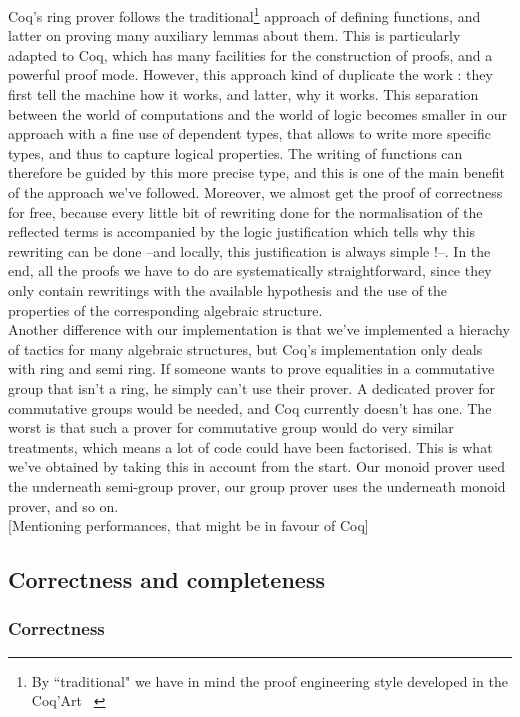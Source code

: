 Coq's ring prover follows the traditional\footnote{By ``traditional" we have in mind the proof engineering style developed in the Coq'Art ~\cite{BertotC04}}  approach of defining functions, and latter on proving many auxiliary lemmas about them. This is particularly adapted to Coq, which has many facilities for the construction of proofs, and a powerful proof mode. However, this approach kind of duplicate the work : they first tell the machine how it works, and latter, why it works. This separation between the world of computations and the world of logic becomes smaller in our approach with a fine use of dependent types, that allows to write more specific types, and thus to capture logical properties. The writing of functions can therefore be guided by this more precise type, and this is one of the main benefit of the approach we've followed. Moreover, we almost get the proof of correctness for free, because every little bit of rewriting done for the normalisation of the reflected terms is accompanied by the logic justification which tells why this rewriting can be done --and locally, this justification is always simple !--. In the end, all the proofs we have to do are systematically straightforward, since they only contain rewritings with the available hypothesis and the use of the properties of the corresponding algebraic structure. \\

Another difference with our implementation is that we've implemented a hierachy of tactics for many algebraic structures, but Coq's implementation only deals with ring and semi ring. If someone wants to prove equalities in a commutative group that isn't a ring, he simply can't use their prover. A dedicated prover for commutative groups would be needed, and Coq currently doesn't has one. The worst is that such a prover for commutative group would do very similar treatments, which means a lot of code could have been factorised. This is what we've obtained by taking this in account from the start. Our monoid prover used the underneath semi-group prover, our group prover uses the underneath monoid prover, and so on. \\

[Mentioning performances, that might be in favour of Coq]

	\subsection {Correctness and completeness}

		\subsubsection{Correctness}
		
